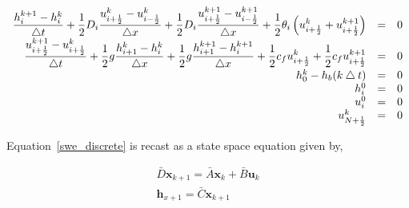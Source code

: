 \begin{equation}
\label{swe_discrete}
\begin{array}{r c l}
\displaystyle  \frac{h_i^{k+1} - h_i^{k}}{\bigtriangleup t} + \frac{1}{2} D_i \frac{u^k_{i+\frac{1}{2}} - u^k_{i-\frac{1}{2}}}{\bigtriangleup x} + \frac{1}{2} D_i \frac{u^{k+1}_{i+\frac{1}{2}} - u^{k+1}_{i-\frac{1}{2}}}{\bigtriangleup x} +  \frac{1}{2} \theta_i \left( u^{k}_{i+\frac{1}{2}} +  u^{k+1}_{i+\frac{1}{2}} \right)  & =  & 0 \\
\displaystyle  \frac{u^{k+1}_{i+\frac{1}{2}} - u^{k}_{i+\frac{1}{2}}}{\bigtriangleup t} + \frac{1}{2} g \frac{h_{i+1}^{k} - h_i^{k}}{\bigtriangleup x}  + \frac{1}{2} g \frac{h_{i+1}^{k+1} - h_i^{k+1}}{\bigtriangleup x} + \frac{1}{2} c_f u^{k}_{i+\frac{1}{2}} + \frac{1}{2} c_f u^{k+1}_{i+\frac{1}{2}} & =  & 0 \\
h^k_0 - h_b(k \bigtriangleup t )  & =  & 0 \\
h_i^0  & =  & 0 \\
u_i^0  & =  & 0 \\
u_{N+\frac{1}{2}}^k  & =  & 0
\end{array}
\end{equation}

Equation~\ref{swe_discrete} is recast as a state space equation given by,

\begin{equation}
\label{swe_statespace}
\begin{array}{l}
\bar{D} \textbf{x}_{k+1} = \bar{A} \textbf{x}_{k} + \bar{B} \textbf{u}_k  \\
\textbf{h}_{x+1} = \bar{C} \textbf{x}_{k+1}
\end{array}
\end{equation}

